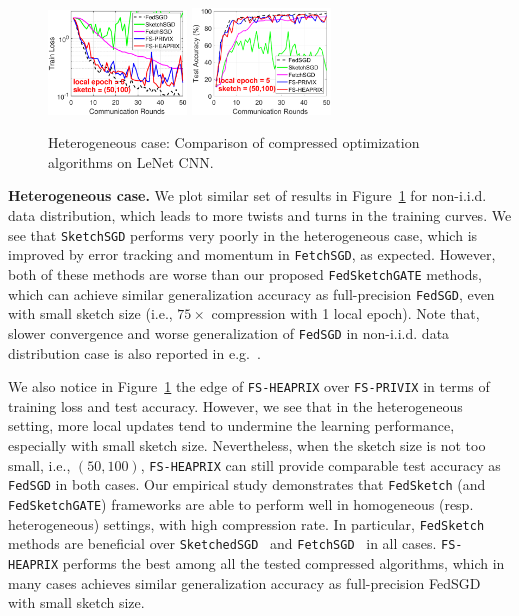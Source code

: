 \documentclass[11pt]{article}
\begin{document}
\begin{figure}[t]
\begin{center}
{		\includegraphics[width=1.45in]{MNIST_figures/local5_sketch50_iid0_train_loss.eps}\hspace{-0.12in}
		\includegraphics[width=1.45in]{MNIST_figures/local5_sketch50_iid0_test_acc.eps}
		}
	\end{center}
	\vspace{-0.1in}
	\caption{Heterogeneous case: Comparison of compressed optimization algorithms on LeNet CNN.}
    \label{fig:MNIST-iid0}
    \vspace{-0.1in}
\end{figure}

\textbf{Heterogeneous case.} We plot similar set of results in Figure~\ref{fig:MNIST-iid0} for non-i.i.d. data distribution, which leads to more twists and turns in the training curves. 
We see that \texttt{SketchSGD} performs very poorly in the heterogeneous case, which is improved by error tracking and momentum in \texttt{FetchSGD}, as expected. However, both of these methods are worse than our proposed \texttt{FedSketchGATE} methods, which can achieve similar generalization accuracy as full-precision \texttt{FedSGD}, even with small sketch size (i.e., $75\times$ compression with 1 local epoch). 
Note that, slower convergence and worse generalization of \texttt{FedSGD} in non-i.i.d. data distribution case is also reported in e.g.~\cite{mcmahan2016communication,chen2020toward}. 

We also notice in Figure~\ref{fig:MNIST-iid0} the edge of \texttt{FS-HEAPRIX} over \texttt{FS-PRIVIX} in terms of training loss and test accuracy. 
However, we see that in the heterogeneous setting, more local updates tend to undermine the learning performance, especially with small sketch size.  
Nevertheless, when the sketch size is not too small, i.e., $(50,100)$, \texttt{FS-HEAPRIX} can still provide comparable test accuracy as \texttt{FedSGD} in both cases.
Our empirical study demonstrates that \texttt{FedSketch} (and \texttt{FedSketchGATE}) frameworks are able to perform well in homogeneous (resp. heterogeneous) settings, with high compression rate. 
In particular, \texttt{FedSketch} methods are beneficial over \texttt{SketchedSGD}~\citep{ivkin2019communication} and \texttt{FetchSGD}~\cite{rothchild2020fetchsgd} in all cases. 
\texttt{FS-HEAPRIX} performs the best among all the tested compressed algorithms, which in many cases achieves similar generalization accuracy as full-precision FedSGD with small sketch size. 
\end{document}
